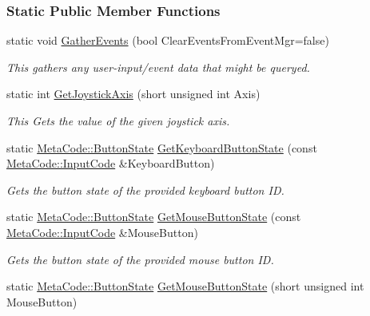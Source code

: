 \subsubsection*{Static Public Member Functions}
\begin{DoxyCompactItemize}
\item 
static void \hyperlink{classMezzanine_1_1InputQueryTool_a1366792f45b0d341e92ad24f5f33680b}{GatherEvents} (bool ClearEventsFromEventMgr=false)
\begin{DoxyCompactList}\small\item\em This gathers any user-\/input/event data that might be queryed. \item\end{DoxyCompactList}\item 
static int \hyperlink{classMezzanine_1_1InputQueryTool_ab655d39e7623c3e17a9279028d450419}{GetJoystickAxis} (short unsigned int Axis)
\begin{DoxyCompactList}\small\item\em This Gets the value of the given joystick axis. \item\end{DoxyCompactList}\item 
static \hyperlink{classMezzanine_1_1MetaCode_a65b6d86ef846369bd8f3fd944a455fd0}{MetaCode::ButtonState} \hyperlink{classMezzanine_1_1InputQueryTool_ab8a1bfa3fd96ae73704084aa31e2bff5}{GetKeyboardButtonState} (const \hyperlink{classMezzanine_1_1MetaCode_a3b5633f0145bf3287cf53a3f05b5563c}{MetaCode::InputCode} \&KeyboardButton)
\begin{DoxyCompactList}\small\item\em Gets the button state of the provided keyboard button ID. \item\end{DoxyCompactList}\item 
static \hyperlink{classMezzanine_1_1MetaCode_a65b6d86ef846369bd8f3fd944a455fd0}{MetaCode::ButtonState} \hyperlink{classMezzanine_1_1InputQueryTool_a0b0f4c52e677de65f320d9305ef64219}{GetMouseButtonState} (const \hyperlink{classMezzanine_1_1MetaCode_a3b5633f0145bf3287cf53a3f05b5563c}{MetaCode::InputCode} \&MouseButton)
\begin{DoxyCompactList}\small\item\em Gets the button state of the provided mouse button ID. \item\end{DoxyCompactList}\item 
static \hyperlink{classMezzanine_1_1MetaCode_a65b6d86ef846369bd8f3fd944a455fd0}{MetaCode::ButtonState} \hyperlink{classMezzanine_1_1InputQueryTool_a7a97f853156573de3648f3315e2283bb}{GetMouseButtonState} (short unsigned int MouseButton)

\end{DoxyCompactItemize}
